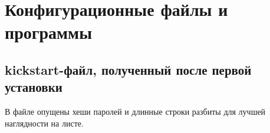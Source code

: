 \chapter{Конфигурационные файлы и программы}


\section{kickstart-файл, полученный после первой установки}
\label{app:kickstart}

В файле опущены хеши паролей и длинные строки разбиты для
лучшей наглядности на листе.


